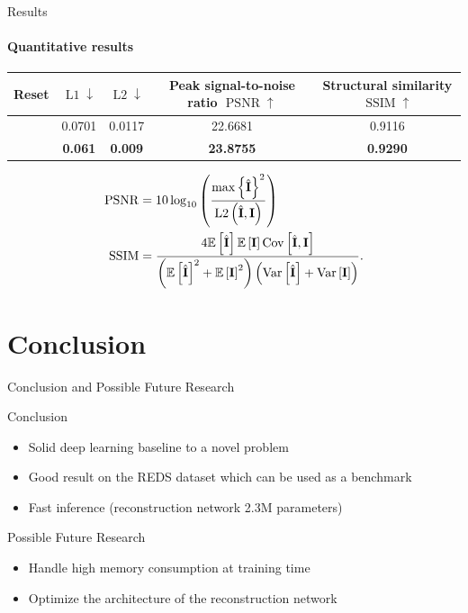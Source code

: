 \documentclass[
	ngerman,
	aspectratio=169,
	color={accentcolor=3d},
	logo=false,
	colorframetitle=true,
	]{tudabeamer}
\newcommand{\cmark}{\ding{51}}
\newcommand{\xmark}{\ding{55}}
\newcommand{\Tensor}[1]{\boldsymbol{\mathrm{\MakeUppercase{#1}}}}
\newcommand{\Mean}[1]{\mathbb{E}\left[#1\right]}
\newcommand{\Var}[1]{\mathrm{Var}\left[#1\right]}
\newcommand{\Cov}[1]{\mathrm{Cov}\left[#1\right]}
\begin{document}
\begin{frame}{Results}
    \framesubtitle{Quantitative results}
    \begin{table}[!htbp]
    \centering
    \begin{center}
        \begin{tabular}{c|c|c|c|c}
            Reset & $\operatorname{L1}\downarrow$ & $\operatorname{L2}\downarrow$ & Peak signal-to-noise ratio $\operatorname{PSNR}\uparrow$ & Structural similarity $\operatorname{SSIM}\uparrow$ \\ 
            \hline 
            \cmark & 0.0701 & 0.0117 & 22.6681 & 0.9116 \\
            \xmark & {\bf 0.061} & {\bf 0.009} & {\bf 23.8755} & {\bf 0.9290} \\ 
            \hline 
        \end{tabular} 
    \end{center}
    \end{table}
    \begin{align*}
        \operatorname{PSNR}&=10 \log_{10}\left(\frac{\max\left\{\hat{\Tensor{I}}\right\}^2}{\operatorname{L2}\left(\hat{\Tensor{I}}, \Tensor{I}\right)} \right)\\
        \operatorname{SSIM}&=\frac{4\Mean{\hat{\Tensor{I}}}\Mean{\Tensor{I}}\Cov{\hat{\Tensor{I}}, \Tensor{I}}}{\left(\Mean{\hat{\Tensor{I}}}^2 + \Mean{\Tensor{I}}^2\right)\left(\Var{\hat{\Tensor{I}}} + \Var{\Tensor{I}}\right)}.
    \end{align*}
\end{frame}


\section{Conclusion}

\begin{frame}{Conclusion and Possible Future Research}
    \begin{block}{Conclusion}
    \begin{itemize}
        \item Solid deep learning baseline to a novel problem
        \item Good result on the REDS dataset \cite{REDS} which can be used as a benchmark
        \item Fast inference (reconstruction network 2.3M parameters)
    \end{itemize}
    \end{block}
    \pause
    \begin{block}{Possible Future Research}
        \begin{itemize}
            \item Handle high memory consumption at training time
            \item Optimize the architecture of the reconstruction network 
        \end{itemize}
    \end{block}
\end{frame}
\end{document}

